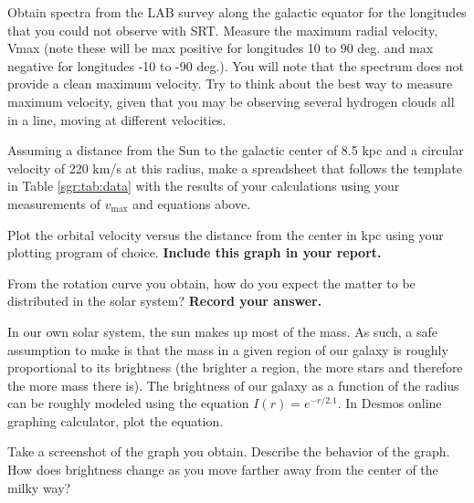 \begin{steps}
	\item Obtain spectra from the LAB survey along the galactic equator for the
	longitudes that you could not observe with SRT. Measure the
	maximum radial velocity, Vmax (note these will be max positive for
	longitudes 10 to 90 deg. and max negative for longitudes -10 to -90
	deg.). You will note that the spectrum does not provide a clean
	maximum velocity. Try to think about the best way to measure
	maximum velocity, given that you may be observing several hydrogen clouds all in a line, moving at different velocities.
	
	
	\item Assuming a distance from the Sun to the galactic center of 8.5 kpc and
	a circular velocity of 220 km/s at this radius, make a spreadsheet that follows the template in Table \ref{sgr:tab:data} with the
	results of your calculations using your measurements of $v_\textrm{max}$ and
	equations above.
	
	\item Plot the orbital velocity versus the distance from the center in kpc using your plotting program of choice. \textbf{Include this graph in your report.}
	
	\item From the rotation curve you obtain, how do you expect the matter to be distributed in the solar system? \textbf{Record your answer.}
	
	\item In our own solar system, the sun makes up most of the mass. As such, a safe assumption to make is that the mass in a given region of our galaxy is roughly proportional to its brightness (the brighter a region, the more stars and therefore the more mass there is). The brightness of our galaxy as a function of the radius can be roughly modeled using the equation $I(r) = e^{-r/2.1}$. In Desmos online graphing calculator, plot the equation. 
	
	\item Take a screenshot of the graph you obtain. Describe the behavior of the graph. How does brightness change as you move farther away from the center of the milky way?
	

\end{steps}
